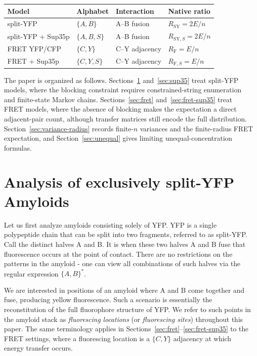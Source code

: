 \documentclass[11pt]{article}
\begin{document}
\begin{center}
\begin{tabular}{llll}
\hline
Model & Alphabet & Interaction & Native ratio \\
\hline
split-YFP & $\{A,B\}$ & A--B fusion & $R_{\text{SY}}=2E/n$ \\
split-YFP + Sup35p & $\{A,B,S\}$ & A--B fusion & $R_{\text{SY},S}=2E/n$ \\
FRET YFP/CFP & $\{C,Y\}$ & C--Y adjacency & $R_{\text{F}}=E/n$ \\
FRET + Sup35p & $\{C,Y,S\}$ & C--Y adjacency & $R_{\text{F},S}=E/n$ \\
\hline
\end{tabular}
\end{center}

The paper is organized as follows. Sections~\ref{sec:split-yfp} and~\ref{sec:sup35} treat split-YFP models, where the blocking constraint requires constrained-string enumeration and finite-state Markov chains. Sections~\ref{sec:fret} and~\ref{sec:fret-sup35} treat FRET models, where the absence of blocking makes the expectation a direct adjacent-pair count, although transfer matrices still encode the full distribution. Section~\ref{sec:variance-radius} records finite-$n$ variances and the finite-radius FRET expectation, and Section~\ref{sec:unequal} gives limiting unequal-concentration formulas.

\section{Analysis of exclusively split-YFP Amyloids}\label{sec:split-yfp}
Let us first analyze amyloids consisting solely of YFP. YFP is a single polypeptide chain that can be split into two fragments, referred to as split-YFP. Call the distinct halves A and B. It is when these two halves A and B fuse that fluorescence occurs at the point of contact. There are no restrictions on the patterns in the amyloid - one can view all combinations of such halves via the regular expression $\{A,B\}^*$. 

We are interested in positions of an amyloid where A and B come together and fuse, producing yellow fluorescence. Such a scenario is essentially the reconstitution of the full fluorophore structure of YFP. We refer to such points in the amyloid stack as \textit{fluorescing locations} (or \textit{fluorescing sites}) throughout this paper. The same terminology applies in Sections~\ref{sec:fret}--\ref{sec:fret-sup35} to the FRET settings, where a fluorescing location is a $\{C, Y\}$ adjacency at which energy transfer occurs.
\end{document}
